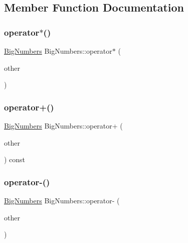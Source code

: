 \subsection{Member Function Documentation}
\mbox{\label{class_big_numbers_ab4a10f12b8f3712f4a5d71f5290bc0f9}} 
\subsubsection{\texorpdfstring{operator$\ast$()}{operator*()}}
{\footnotesize\ttfamily \mbox{\hyperlink{class_big_numbers}{Big\+Numbers}} Big\+Numbers\+::operator$\ast$ (\begin{DoxyParamCaption}\item[{const \mbox{\hyperlink{class_big_numbers}{Big\+Numbers}} \&}]{other }\end{DoxyParamCaption})}

\mbox{\label{class_big_numbers_af666111eecd76c5f808243954b5213d4}} 
\subsubsection{\texorpdfstring{operator+()}{operator+()}}
{\footnotesize\ttfamily \mbox{\hyperlink{class_big_numbers}{Big\+Numbers}} Big\+Numbers\+::operator+ (\begin{DoxyParamCaption}\item[{const \mbox{\hyperlink{class_big_numbers}{Big\+Numbers}} \&}]{other }\end{DoxyParamCaption}) const}

\mbox{\label{class_big_numbers_ac8b9a03b6c074439aaa29417b743189b}} 
\subsubsection{\texorpdfstring{operator-\/()}{operator-()}}
{\footnotesize\ttfamily \mbox{\hyperlink{class_big_numbers}{Big\+Numbers}} Big\+Numbers\+::operator-\/ (\begin{DoxyParamCaption}\item[{const \mbox{\hyperlink{class_big_numbers}{Big\+Numbers}} \&}]{other }\end{DoxyParamCaption})}

